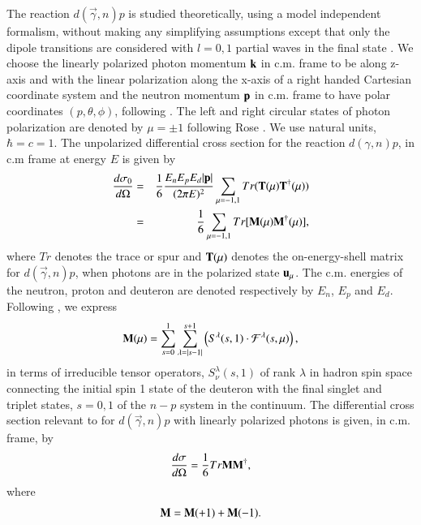 The reaction $d(\vec \gamma, n)p$ is studied theoretically, using a model independent formalism, without making any simplifying assumptions  except that only the dipole transitions are considered with $l=0,1$  partial waves in the final state \cite{chap34-key50}. We choose the linearly polarized photon momentum ${\bf k}$ in c.m. frame to be along z-axis and with the linear polarization along the x-axis of a right handed Cartesian coordinate system and the neutron momentum ${\bf p}$ in c.m. frame to have polar coordinates $(p,\theta,\phi)$, following \cite{chap34-key45}. The left and right circular states of photon polarization are denoted by $\mu =\pm 1$  following Rose \cite{chap34-key51}.  We use natural units, $\hbar = c=1$.  The unpolarized differential cross section for the reaction $d(\gamma, n)p$, in c.m frame at energy $E$ is given by 
\makeatletter
{}
\makeatother
\begin{eqnarray}
{d\sigma_0 \over d\Omega}&=&{1 \over 6} { E_n E_p E_d |{\bf p}| \over (2\pi E)^2 } \sum_{\mu=-1,1} Tr({\bf T}(\mu) {\bf T}^\dagger(\mu)) \nonumber \\ 
 &=& {1 \over 6} \sum_{\mu=-1,1} Tr[{\bf M}(\mu) {\bf M}^\dagger(\mu)], \label{chap34-eq1}
\end{eqnarray}
where $Tr$ denotes the trace or spur and ${\bf T}(\mu)$ denotes the on-energy-shell matrix for $d(\vec \gamma, n)p$,  when photons are in the polarized state ${\bf u}_\mu$. The c.m. energies of the neutron, proton and deuteron are denoted respectively by $E_n$, $E_p$ and  $E_d$.  Following \cite{chap34-key52}, we express 
\begin{equation}
{\bf M}(\mu) = \sum_{s=0}^1 \sum_{\lambda = |s-1|}^{s+1} \left(S^\lambda(s,1) \cdot {\mathcal F}^\lambda(s,\mu)\right), \label{chap34-eq2}
\end{equation}
in terms of irreducible tensor operators, $S^\lambda_{\nu}(s,1)$ of rank $\lambda$ in hadron spin space \cite{chap34-key53} connecting the initial spin 1 state of the deuteron with the final singlet and triplet states, $s=0,1$ of  the $n-p$ system in the continuum.  The differential cross section relevant to \cite{chap34-key45,chap34-key46} for $d(\vec \gamma, n)p$ with linearly  polarized photons is given, in c.m. frame, by  
\begin{eqnarray}
{d\sigma \over d\Omega} ={1 \over 6} Tr {\bf M M^\dagger}, \label{chap34-eq3}
\end{eqnarray}
where
\begin{equation} 
{\bf M= M}(+1)+{\bf M}(-1).\label{chap34-eq4}
\end{equation}
